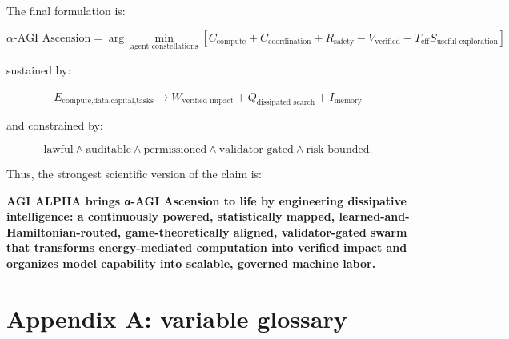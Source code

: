 \documentclass[11pt]{article}
\begin{document}
The final formulation is:

\[
\boxed{
\alpha\text{-AGI Ascension}
=
\arg\min_{\text{agent constellations}}
\left[
C_{\text{compute}}+C_{\text{coordination}}+R_{\text{safety}}-V_{\text{verified}}-T_{\text{eff}}S_{\text{useful exploration}}
\right]
}
\]

sustained by:

\[
\boxed{
\dot{E}_{\text{compute,data,capital,tasks}}
\rightarrow
\dot{W}_{\text{verified impact}}
+
\dot{Q}_{\text{dissipated search}}
+
\dot{I}_{\text{memory}}
}
\]

and constrained by:

\[
\boxed{
\text{lawful}\land\text{auditable}\land\text{permissioned}\land\text{validator-gated}\land\text{risk-bounded}.
}
\]

Thus, the strongest scientific version of the claim is:

\textbf{AGI ALPHA brings α-AGI Ascension to life by engineering
dissipative intelligence: a continuously powered, statistically mapped,
learned-and-Hamiltonian-routed, game-theoretically aligned,
validator-gated swarm that transforms energy-mediated computation into
verified impact and organizes model capability into scalable, governed
machine labor.}

\section{Appendix A: variable
glossary}\label{appendix-a-variable-glossary}
\end{document}
